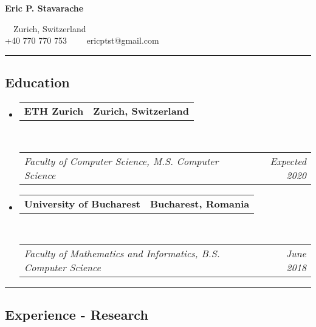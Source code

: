 \documentclass[10pt,letterpaper]{article}
\makeatletter
\newcommand{\headerrow}[2]
{\begin{tabular*}{\linewidth}{l@{\extracolsep{\fill}}r}
	#1 &
	#2 \\
\end{tabular*}}
\makeatother
\begin{document}
\begin{center}
{\LARGE \textbf{Eric P. Stavarache}}

\ \ Zurich, Switzerland
\\
+40 770 770 753\ \ \textbullet
\ \ ericptst@gmail.com
\end{center}

\hrule
\vspace{-1em}

\subsection*{Education}

\begin{itemize}
	\parskip=0.1em

	\item
	\headerrow
		{\textbf{ETH Zurich}}
		{\textbf{Zurich, Switzerland}}
	\\
	\headerrow
		{\emph{Faculty of Computer Science, M.S. Computer Science}}
		{\emph{Expected 2020}}

	\item
	\headerrow
		{\textbf{University of Bucharest}}
		{\textbf{Bucharest, Romania}}
	\\
	\headerrow
		{\emph{Faculty of Mathematics and Informatics, B.S. Computer Science}}
		{\emph{June 2018}}

\end{itemize}

\hrule
\vspace{-1em}
\subsection*{Experience - Research}
\end{document}
